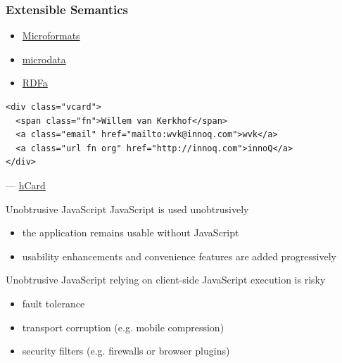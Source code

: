 \documentclass{beamer}
\begin{document}
\begin{frame}[fragile]
  \frametitle{Extensible Semantics}

  \begin{itemize}
    \item \href{http://microformats.org}{Microformats}
    \item \href{http://www.w3.org/TR/microdata/}{microdata}
    \item \href{http://rdfa.info}{RDFa}
  \end{itemize}

  \begin{verbatim}
<div class="vcard">
  <span class="fn">Willem van Kerkhof</span>
  <a class="email" href="mailto:wvk@innoq.com">wvk</a>
  <a class="url fn org" href="http://innoq.com">innoQ</a>
</div>
  \end{verbatim}
  --- \href{http://microformats.org/wiki/hcard}{hCard}

\end{frame}

\begin{frame}{Unobtrusive JavaScript}
  JavaScript is used unobtrusively

  \begin{itemize}
    \item the application remains usable without JavaScript
    \item usability enhancements and convenience features are added progressively
  \end{itemize}
\end{frame}

\begin{frame}{Unobtrusive JavaScript}
  relying on client-side JavaScript execution is risky

  \begin{itemize}
    \item fault tolerance
    \item transport corruption (e.g. mobile compression)
    \item security filters (e.g. firewalls or browser plugins)
  \end{itemize}
\end{frame}
\end{document}
